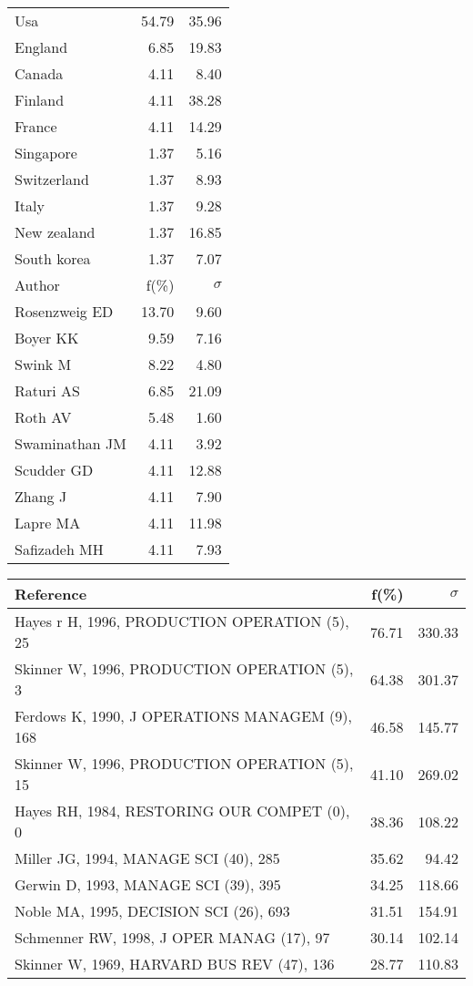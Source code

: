\documentclass[a4paper,11pt]{report}
\begin{document}
\begin{landscape}
\begin{table}[!ht]
{\begin{tabular}{|l r r|}
Usa & 54.79 & 35.96\\
England & 6.85 & 19.83\\
Canada & 4.11 & 8.40\\
Finland & 4.11 & 38.28\\
France & 4.11 & 14.29\\
Singapore & 1.37 & 5.16\\
Switzerland & 1.37 & 8.93\\
Italy & 1.37 & 9.28\\
New zealand & 1.37 & 16.85\\
South korea & 1.37 & 7.07\\
\hline
\hline
Author & f(\%) & $\sigma$\\
\hline
Rosenzweig ED & 13.70 & 9.60\\
Boyer KK & 9.59 & 7.16\\
Swink M & 8.22 & 4.80\\
Raturi AS & 6.85 & 21.09\\
Roth AV & 5.48 & 1.60\\
Swaminathan JM & 4.11 & 3.92\\
Scudder GD & 4.11 & 12.88\\
Zhang J & 4.11 & 7.90\\
Lapre MA & 4.11 & 11.98\\
Safizadeh MH & 4.11 & 7.93\\
\hline
\end{tabular}
}
{\scriptsize\begin{tabular}{|l r r|}
\hline
Reference & f(\%) & $\sigma$\\
\hline
Hayes r H, 1996, PRODUCTION OPERATION (5), 25 & 76.71 & 330.33\\
Skinner W, 1996, PRODUCTION OPERATION (5), 3 & 64.38 & 301.37\\
Ferdows K, 1990, J OPERATIONS MANAGEM (9), 168 & 46.58 & 145.77\\
Skinner W, 1996, PRODUCTION OPERATION (5), 15 & 41.10 & 269.02\\
Hayes RH, 1984, RESTORING OUR COMPET (0), 0 & 38.36 & 108.22\\
Miller JG, 1994, MANAGE SCI (40), 285 & 35.62 & 94.42\\
Gerwin D, 1993, MANAGE SCI (39), 395 & 34.25 & 118.66\\
Noble MA, 1995, DECISION SCI (26), 693 & 31.51 & 154.91\\
Schmenner RW, 1998, J OPER MANAG (17), 97 & 30.14 & 102.14\\
Skinner W, 1969, HARVARD BUS REV (47), 136 & 28.77 & 110.83\\

\end{tabular}}
\end{table}
\end{landscape}
\end{document}
